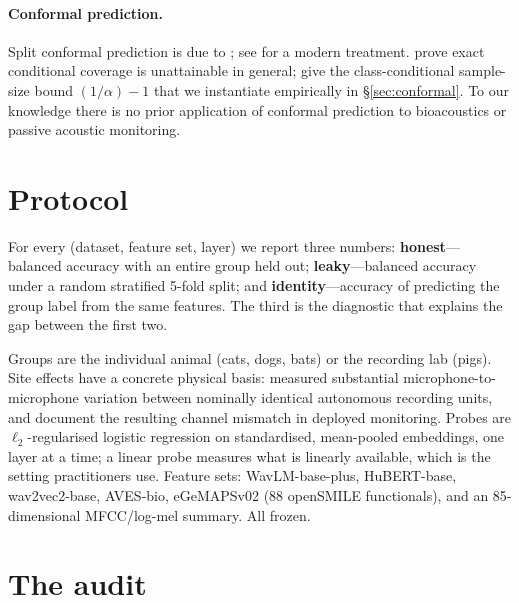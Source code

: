 \documentclass{article}
\begin{document}
\paragraph{Conformal prediction.}
Split conformal prediction is due to \citet{vovk2013}; see \citet{angelopoulos2023} for a modern
treatment. \citet{barber2021} prove exact conditional coverage is unattainable in general; \citet{ding2023} give
the class-conditional sample-size bound $(1/\alpha)-1$ that we instantiate empirically in
\S\ref{sec:conformal}. To our knowledge there is no prior application of conformal prediction to bioacoustics or passive
acoustic monitoring.

\section{Protocol}

For every (dataset, feature set, layer) we report three numbers: \textbf{honest}---balanced accuracy
with an entire group held out; \textbf{leaky}---balanced accuracy under a random stratified 5-fold
split; and \textbf{identity}---accuracy of predicting the group label from the same features. The
third is the diagnostic that explains the gap between the first two.

Groups are the individual animal (cats, dogs, bats) or the recording lab (pigs). Site effects have a
concrete physical basis: \citet{turgeon2017} measured substantial microphone-to-microphone variation
between nominally identical autonomous recording units, and \citet{lostanlen2019} document the
resulting channel mismatch in deployed monitoring. Probes are
$\ell_2$-regularised logistic regression on standardised, mean-pooled embeddings, one layer at a
time; a linear probe measures what is linearly available, which is the setting practitioners use.
Feature sets: WavLM-base-plus, HuBERT-base, wav2vec2-base, AVES-bio, eGeMAPSv02 (88 openSMILE
functionals), and an 85-dimensional MFCC/log-mel summary. All frozen.

\section{The audit}\label{sec:audit}
\end{document}

